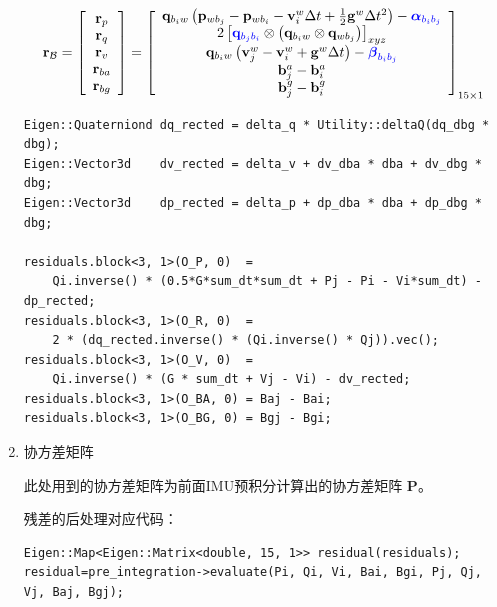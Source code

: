 \documentclass[12pt,a4paper]{article}
\begin{document}
\begin{enumerate}
\begin{equation}
\label{equ:residual_imu_q}
\mathbf{r}_{\mathcal{B}}
=
\left[\begin{array}{c}
{\mathbf{r}_{p}} \\ 
{\mathbf{r}_{q}} \\ 
{\mathbf{r}_{v}} \\ 
{\mathbf{r}_{b a}} \\ 
{\mathbf{r}_{b g}}
\end{array}\right]
=
\left[\begin{array}{c}
{\mathbf{q}_{b_{i} w}\left(\mathbf{p}_{w b_{j}}-\mathbf{p}_{w b_{i}}-\mathbf{v}_{i}^{w} \Delta t+\frac{1}{2} \mathbf{g}^{w} \Delta t^{2}\right)-{\color{blue}\boldsymbol{\alpha}_{b_{i} b_{j}}}} \\ 
{2\left[{\color{blue}\mathbf{q}_{b_{j} b_{i}}} \otimes\left(\mathbf{q}_{b_{i} w} \otimes \mathbf{q}_{w b_{j}}\right)\right]_{xyz}} \\ 
{\mathbf{q}_{b_{i} w}\left(\mathbf{v}_{j}^{w}-\mathbf{v}_{i}^{w}+\mathbf{g}^{w} \Delta t\right)-{\color{blue}\boldsymbol{\beta}_{b_{i} b_{j}}}} \\ 
{\mathbf{b}_{j}^{a}-\mathbf{b}_{i}^{a}} \\ 
{\mathbf{b}_{j}^{g}-\mathbf{b}_{i}^{g}}
\end{array}\right]_{15 \times 1}
\end{equation}

\begin{lstlisting}
Eigen::Quaterniond dq_rected = delta_q * Utility::deltaQ(dq_dbg * dbg);
Eigen::Vector3d    dv_rected = delta_v + dv_dba * dba + dv_dbg * dbg;
Eigen::Vector3d    dp_rected = delta_p + dp_dba * dba + dp_dbg * dbg;

residuals.block<3, 1>(O_P, 0)  = 
    Qi.inverse() * (0.5*G*sum_dt*sum_dt + Pj - Pi - Vi*sum_dt) - dp_rected;
residuals.block<3, 1>(O_R, 0)  = 
    2 * (dq_rected.inverse() * (Qi.inverse() * Qj)).vec();
residuals.block<3, 1>(O_V, 0)  = 
    Qi.inverse() * (G * sum_dt + Vj - Vi) - dv_rected;
residuals.block<3, 1>(O_BA, 0) = Baj - Bai;
residuals.block<3, 1>(O_BG, 0) = Bgj - Bgi;
\end{lstlisting}

\item 协方差矩阵

此处用到的协方差矩阵为前面IMU预积分计算出的协方差矩阵 $\mathbf{P}$。

残差的后处理对应代码：

\begin{lstlisting}
Eigen::Map<Eigen::Matrix<double, 15, 1>> residual(residuals);
residual=pre_integration->evaluate(Pi, Qi, Vi, Bai, Bgi, Pj, Qj, Vj, Baj, Bgj);


\end{lstlisting}
\end{enumerate}
\end{document}
